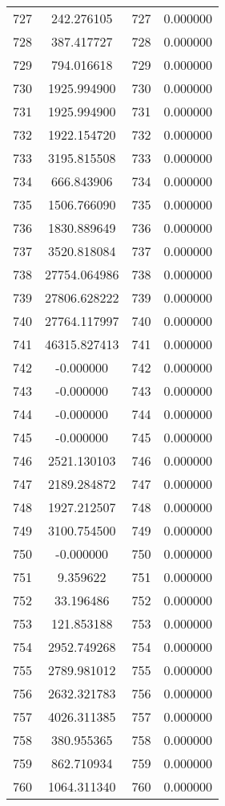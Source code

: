 \documentclass[12pt]{article}
\begin{document}
\begin{longtable}{@{}cccc@{}}
727 & 242.276105 & 727 & 0.000000 \\
728 & 387.417727 & 728 & 0.000000 \\
729 & 794.016618 & 729 & 0.000000 \\
730 & 1925.994900 & 730 & 0.000000 \\
731 & 1925.994900 & 731 & 0.000000 \\
732 & 1922.154720 & 732 & 0.000000 \\
733 & 3195.815508 & 733 & 0.000000 \\
734 & 666.843906 & 734 & 0.000000 \\
735 & 1506.766090 & 735 & 0.000000 \\
736 & 1830.889649 & 736 & 0.000000 \\
737 & 3520.818084 & 737 & 0.000000 \\
738 & 27754.064986 & 738 & 0.000000 \\
739 & 27806.628222 & 739 & 0.000000 \\
740 & 27764.117997 & 740 & 0.000000 \\
741 & 46315.827413 & 741 & 0.000000 \\
742 & -0.000000 & 742 & 0.000000 \\
743 & -0.000000 & 743 & 0.000000 \\
744 & -0.000000 & 744 & 0.000000 \\
745 & -0.000000 & 745 & 0.000000 \\
746 & 2521.130103 & 746 & 0.000000 \\
747 & 2189.284872 & 747 & 0.000000 \\
748 & 1927.212507 & 748 & 0.000000 \\
749 & 3100.754500 & 749 & 0.000000 \\
750 & -0.000000 & 750 & 0.000000 \\
751 & 9.359622 & 751 & 0.000000 \\
752 & 33.196486 & 752 & 0.000000 \\
753 & 121.853188 & 753 & 0.000000 \\
754 & 2952.749268 & 754 & 0.000000 \\
755 & 2789.981012 & 755 & 0.000000 \\
756 & 2632.321783 & 756 & 0.000000 \\
757 & 4026.311385 & 757 & 0.000000 \\
758 & 380.955365 & 758 & 0.000000 \\
759 & 862.710934 & 759 & 0.000000 \\
760 & 1064.311340 & 760 & 0.000000 \\

\end{longtable}
\end{document}

